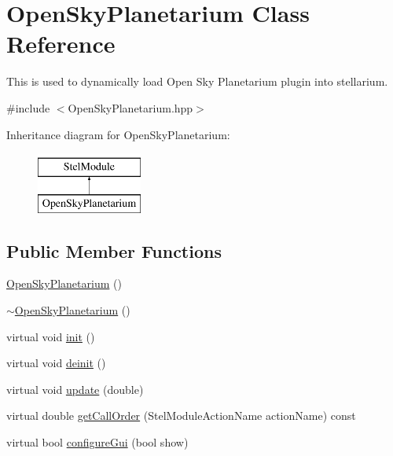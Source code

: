 \hypertarget{class_open_sky_planetarium}{\section{Open\-Sky\-Planetarium Class Reference}
\label{class_open_sky_planetarium}
}


This is used to dynamically load Open Sky Planetarium plugin into stellarium.  




{\ttfamily \#include $<$Open\-Sky\-Planetarium.\-hpp$>$}

Inheritance diagram for Open\-Sky\-Planetarium\-:\begin{figure}[H]
\begin{center}
\leavevmode
\includegraphics[height=2.000000cm]{class_open_sky_planetarium}
\end{center}
\end{figure}
\subsection*{Public Member Functions}
\begin{DoxyCompactItemize}
\item 
\hyperlink{class_open_sky_planetarium_a5f8863f2909ea7c84722d8f1d1410aac}{Open\-Sky\-Planetarium} ()
\item 
\hyperlink{class_open_sky_planetarium_a4df59ddbb670aef575f97bbcef1267c8}{$\sim$\-Open\-Sky\-Planetarium} ()
\item 
virtual void \hyperlink{class_open_sky_planetarium_ad3219ba7597f58f41eb2f175b5b3ca43}{init} ()
\item 
virtual void \hyperlink{class_open_sky_planetarium_a163cb7c2ecf113d829f0eec67d4e853d}{deinit} ()
\item 
virtual void \hyperlink{class_open_sky_planetarium_a71cdbeed316e46fc4e84bf76fadabe62}{update} (double)
\item 
virtual double \hyperlink{class_open_sky_planetarium_a7880a253b939c93cc93bb10bbc04fd96}{get\-Call\-Order} (Stel\-Module\-Action\-Name action\-Name) const 
\item 
virtual bool \hyperlink{class_open_sky_planetarium_a36c4660bffbd77013a7f1007f9cace16}{configure\-Gui} (bool show)
\end{DoxyCompactItemize}


